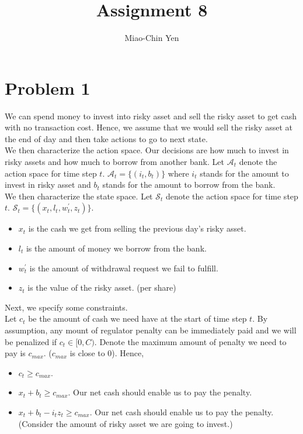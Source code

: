 \documentclass{article}
\title{Assignment 8}
\author{Miao-Chin Yen}
\begin{document}
\maketitle
\section*{Problem 1}
We can spend money to invest into risky asset and sell the risky asset to get cash with no transaction cost. Hence, we assume that we would sell the risky asset at the end of day and then take actions to go to next state.\\
We then characterize the action space. Our decisions are how much to invest in risky assets and how much to borrow from another bank. Let $\mathcal{A}_{t}$ denote the action space for time step $t$. $\mathcal{A}_{t} =\{(i_{t}, b_{t})\} $ where $i_{t}$ stands for the amount to invest in risky asset and $b_{t}$ stands for the amount to borrow from the bank.\\ We then characterize the state space. Let $\mathcal{S}_{t}$ denote the action space for time step $t$. $\mathcal{S}_{t} =\{(x_{t}, l_{t}, w^{\prime}_{t}, z_{t})\}$.
\begin{itemize}
\item $x_{t}$ is the cash we get from selling the previous day's risky asset.
\item $l_{t}$ is the amount of money we borrow from the bank.
\item $w^{\prime}_{t}$ is the amount of withdrawal request we fail to fulfill.
\item $z_{t}$ is the value of the risky asset. (per share)
\end{itemize}
Next, we specify some constraints.\\
Let $c_{t}$ be the amount of cash we need have at the start of time step $t$. By assumption, any mount of regulator penalty can be immediately paid and we will be penalized if $c_{t} \in [0, C)$. Denote the maximum amount of penalty we need to pay is $c_{max}$. ($c_{max}$ is close to 0). Hence,
\begin{itemize}
\item $c_{t} \geq c_{max}$.
\item $x_{t} + b_{t} \geq c_{max}$. Our net cash should enable us to pay the penalty.
\item $x_{t} + b_{t}-i_{t}z_{t} \geq c_{max}$. Our net cash should enable us to pay the penalty.(Consider the amount of risky asset we are going to invest.)
\end{itemize}
\end{document}

